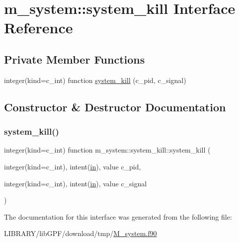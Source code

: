 \hypertarget{interfacem__system_1_1system__kill}{}\section{m\+\_\+system\+:\+:system\+\_\+kill Interface Reference}
\label{interfacem__system_1_1system__kill}
\subsection*{Private Member Functions}
\begin{DoxyCompactItemize}
\item 
integer(kind=c\+\_\+int) function \hyperlink{interfacem__system_1_1system__kill_a79ff46722f540f931d947f90bdf2c8ea}{system\+\_\+kill} (c\+\_\+pid, c\+\_\+signal)
\end{DoxyCompactItemize}


\subsection{Constructor \& Destructor Documentation}
\mbox{\label{interfacem__system_1_1system__kill_a79ff46722f540f931d947f90bdf2c8ea}} 
\subsubsection{\texorpdfstring{system\+\_\+kill()}{system\_kill()}}
{\footnotesize\ttfamily integer(kind=c\+\_\+int) function m\+\_\+system\+::system\+\_\+kill\+::system\+\_\+kill (\begin{DoxyParamCaption}\item[{integer(kind=c\+\_\+int), intent(\hyperlink{M__journal_83_8txt_afce72651d1eed785a2132bee863b2f38}{in}), value}]{c\+\_\+pid,  }\item[{integer(kind=c\+\_\+int), intent(\hyperlink{M__journal_83_8txt_afce72651d1eed785a2132bee863b2f38}{in}), value}]{c\+\_\+signal }\end{DoxyParamCaption})\hspace{0.3cm}{\ttfamily [private]}}



The documentation for this interface was generated from the following file\+:\begin{DoxyCompactItemize}
\item 
L\+I\+B\+R\+A\+R\+Y/lib\+G\+P\+F/download/tmp/\hyperlink{M__system_8f90}{M\+\_\+system.\+f90}\end{DoxyCompactItemize}
